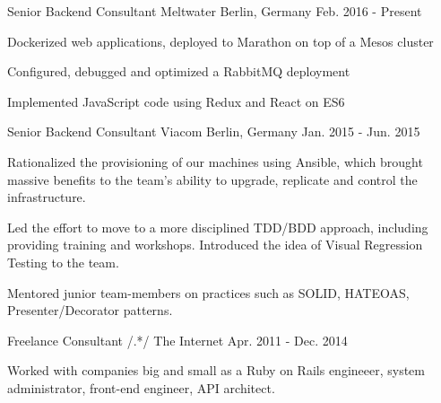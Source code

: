

\begin{cventries}

  \cventry
    {Senior Backend Consultant} %
    {Meltwater} %
    {Berlin, Germany} %
    {Feb. 2016 - Present} %
    {
      \begin{cvitems} %
        \item {Dockerized web applications, deployed to Marathon on top of a
            Mesos cluster}
        \item {Configured, debugged and optimized a RabbitMQ deployment}
        \item {Implemented JavaScript code using Redux and React on ES6}
      \end{cvitems}
    }

  \cventry
    {Senior Backend Consultant} %
    {Viacom} %
    {Berlin, Germany} %
    {Jan. 2015 - Jun. 2015} %
    {
      \begin{cvitems} %
        \item {Rationalized the provisioning of our machines using
            Ansible, which brought massive benefits to the team's ability to
            upgrade, replicate and control the infrastructure.}
        \item{Led the effort to move to a more disciplined TDD/BDD approach,
            including providing training and workshops. Introduced the idea of Visual Regression Testing to the team.}
        \item{Mentored junior team-members on practices such as SOLID, HATEOAS,
            Presenter/Decorator patterns.}
      \end{cvitems}
    }

  \cventry
    {Freelance Consultant} %
    {/.*/} %
    {The Internet} %
    {Apr. 2011 - Dec. 2014} %
    {
      \begin{cvitems} %
        Worked with companies big and small as a Ruby on Rails engineeer,
          system administrator, front-end engineer, API architect.
      \end{cvitems}
    }


\end{cventries}
